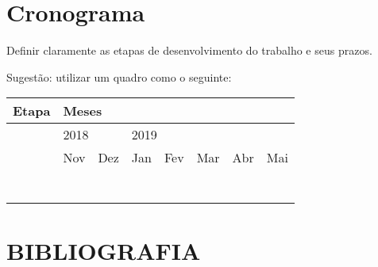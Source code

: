 \documentclass[prop-esp]{iiufrgs}
\begin{document}
%
\chapter{Cronograma}

\noindent Definir claramente as etapas de desenvolvimento do trabalho e seus prazos.

\noindent 

\noindent Sugest\~{a}o: utilizar um quadro como o seguinte:

\noindent 

\begin{tabular}{|p{1.8in}|p{0.3in}|p{0.3in}|p{0.3in}|p{0.3in}|p{0.3in}|p{0.3in}|p{0.3in}|} \hline 
Etapa & \multicolumn{7}{|p{2.0in}|}{Meses} \\ \hline 
 & \multicolumn{2}{|p{0.6in}|}{2018} & \multicolumn{5}{|p{1.4in}|}{2019} \\ \hline 
 & Nov & Dez & Jan & Fev & Mar & Abr & Mai \\ \hline 
 &  &  &  &  &  &  &  \\ \hline 
 &  &  &  &  &  &  &  \\ \hline 
 &  &  &  &  &  &  &  \\ \hline 
 &  &  &  &  &  &  &  \\ \hline 
 &  &  &  &  &  &  &  \\ \hline 
 &  &  &  &  &  &  &  \\ \hline 
 &  &  &  &  &  &  &  \\ \hline 
\end{tabular}



%
\chapter{BIBLIOGRAFIA}



\end{document}
